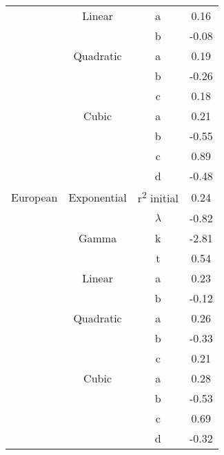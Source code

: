 \documentclass[11pt]{article}
\begin{document}
\begin{longtable}{c c c c}
           & Linear      & a                          & 0.16          \\  
           &             & b                          & -0.08         \\  
           & Quadratic   & a                          & 0.19          \\  
           &             & b                          & -0.26         \\  
           &             & c                          & 0.18          \\  
           & Cubic       & a                          & 0.21          \\  
           &             & b                          & -0.55         \\  
           &             & c                          & 0.89          \\  
           &             & d                          & -0.48         \\  \hline
European   & Exponential & r\textsuperscript2 initial & 0.24          \\  
           &             & $\lambda$                  & -0.82         \\  
           & Gamma       & k                          & -2.81         \\  
           &             & t                          & 0.54          \\  
           & Linear      & a                          & 0.23          \\  
           &             & b                          & -0.12         \\  
           & Quadratic   & a                          & 0.26          \\  
           &             & b                          & -0.33         \\  
           &             & c                          & 0.21          \\  
           & Cubic       & a                          & 0.28          \\  
           &             & b                          & -0.53         \\  
           &             & c                          & 0.69          \\  
           &             & d                          & -0.32         \\ \hline
\end{longtable}
\end{document}
